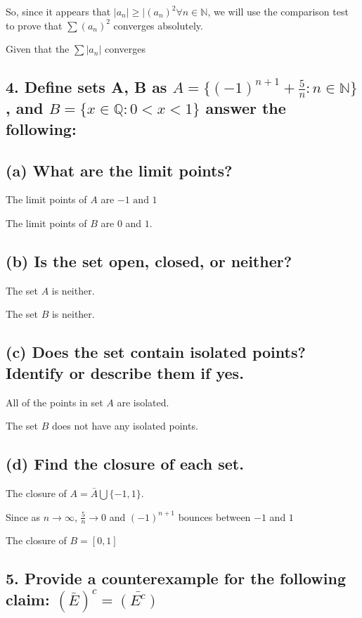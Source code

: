 \documentclass{article}
\begin{document}
So, since it appears that $|a_n| \ge |(a_n)^2 \forall n \in \mathbb{N}$, we will use the comparison test to prove that 
$\sum (a_n)^2$ converges absolutely.

Given that the $\sum |a_n|$ converges




\subsection*{4. Define sets A, B as $A = \{(-1)^{n+1} + \frac{5}{n} : n \in \mathbb{N}\}$, and $B = \{ x \in \mathbb{Q}: 0 < x < 1\}$ answer the following:}

\subsection*{(a) What are the limit points?}

The limit points of $A$ are $-1 \text{ and } 1$

The limit points of $B$ are $0$ and $1$.

\subsection*{(b) Is the set open, closed, or neither?}

The set $A$ is neither.

The set $B$ is neither.

\subsection*{(c) Does the set contain isolated points? Identify or describe them if yes.}

All of the points in set $A$ are isolated.

The set $B$ does not have any isolated points.

\subsection*{(d) Find the closure of each set.}

The closure of $A = \bar{A} \bigcup \{-1,1\}$.

Since as $n \rightarrow \infty$, $\frac{5}{n} \rightarrow 0$ and $(-1)^{n+1}$ bounces between $-1$ and $1$

The closure of $B = [0,1]$

\subsection*{5. Provide a counterexample for the following claim: $( \bar{E} )^c = \bar{(E^c)}$ }
\end{document}
